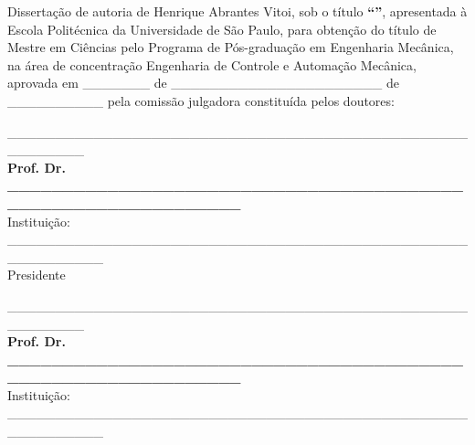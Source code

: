 \documentclass[
	12pt,				%
	oneside,			%
	a4paper,			%
	english,			%
	brazil				%
]{abntex2}
\begin{document}
\frenchspacing 		%
\imprimircapa
\imprimirfolhaderosto*

\begin{fichacatalografica}
    
\end{fichacatalografica}

\begin{folhadeaprovacao}

	\noindent Dissertação de autoria de Henrique Abrantes Vitoi, sob o título \textbf{``\imprimirtitulo''}, apresentada à Escola Politécnica da Universidade de São Paulo, para obtenção do título de Mestre em Ciências pelo Programa de Pós-graduação em Engenharia Mecânica, na área de concentração Engenharia de Controle e Automação Mecânica, aprovada em \_\_\_\_\_\_\_ de \_\_\_\_\_\_\_\_\_\_\_\_\_\_\_\_\_\_\_\_\_\_ de \_\_\_\_\_\_\_\_\_\_ pela comissão julgadora constituída pelos doutores:
	\vspace*{3cm}
	\begin{center}
		\_\_\_\_\_\_\_\_\_\_\_\_\_\_\_\_\_\_\_\_\_\_\_\_\_\_\_\_\_\_\_\_\_\_\_\_\_\_\_\_\_\_\_\_\_\_\_\_\_\_\_\_\_\_\_\_
		\vspace*{0.2cm} 
		\\ \textbf{Prof. Dr. \_\_\_\_\_\_\_\_\_\_\_\_\_\_\_\_\_\_\_\_\_\_\_\_\_\_\_\_\_\_\_\_\_\_\_\_\_\_\_\_\_\_\_\_\_\_\_\_\_\_\_\_\_\_\_\_\_\_\_\_\_\_} 
		\\ \vspace*{0.2cm} 
		Instituição: \_\_\_\_\_\_\_\_\_\_\_\_\_\_\_\_\_\_\_\_\_\_\_\_\_\_\_\_\_\_\_\_\_\_\_\_\_\_\_\_\_\_\_\_\_\_\_\_\_\_\_\_\_\_\_\_\_\_ 
		\\ \vspace*{0.2cm}
		Presidente 

		\vspace*{2cm}

		\_\_\_\_\_\_\_\_\_\_\_\_\_\_\_\_\_\_\_\_\_\_\_\_\_\_\_\_\_\_\_\_\_\_\_\_\_\_\_\_\_\_\_\_\_\_\_\_\_\_\_\_\_\_\_\_
		\vspace*{0.2cm} 
		\\ \textbf{Prof. Dr. \_\_\_\_\_\_\_\_\_\_\_\_\_\_\_\_\_\_\_\_\_\_\_\_\_\_\_\_\_\_\_\_\_\_\_\_\_\_\_\_\_\_\_\_\_\_\_\_\_\_\_\_\_\_\_\_\_\_\_\_\_\_} 
		\\ \vspace*{0.2cm} 
		Instituição: \_\_\_\_\_\_\_\_\_\_\_\_\_\_\_\_\_\_\_\_\_\_\_\_\_\_\_\_\_\_\_\_\_\_\_\_\_\_\_\_\_\_\_\_\_\_\_\_\_\_\_\_\_\_\_\_\_\_

		\vspace*{2cm}


\end{center}
\end{folhadeaprovacao}
\end{document}
